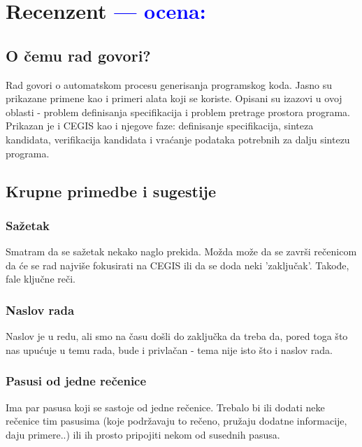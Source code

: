 \documentclass[a4paper]{report}
\newcommand{\odgovor}[1]{\textcolor{blue}{#1}}
\begin{document}
\chapter{Recenzent \odgovor{--- ocena:} }


\section{O čemu rad govori?}
Rad govori o automatskom procesu generisanja programskog koda. Jasno su prikazane primene kao i primeri alata koji se koriste. Opisani su izazovi u ovoj oblasti - problem definisanja specifikacija i problem pretrage prostora programa. Prikazan je i CEGIS kao i njegove faze: definisanje specifikacija, sinteza kandidata, verifikacija kandidata i vraćanje podataka potrebnih za dalju sintezu programa.


\section{Krupne primedbe i sugestije}


\subsection{Sažetak}

Smatram da se sažetak nekako naglo prekida. Možda može da se završi rečenicom da će se rad najviše fokusirati na CEGIS ili da se doda neki 'zaključak'. Takođe, fale ključne reči.



\subsection{Naslov rada}
Naslov je u redu, ali smo na času došli do zaključka da treba da, pored toga što nas upućuje u temu rada, bude i privlačan - tema nije isto što i naslov rada.



\subsection{Pasusi od jedne rečenice}
Ima par pasusa koji se sastoje od jedne rečenice. Trebalo bi ili dodati neke rečenice tim pasusima (koje podržavaju to rečeno, pružaju dodatne informacije, daju primere..) ili ih prosto pripojiti nekom od susednih pasusa. 
\end{document}
